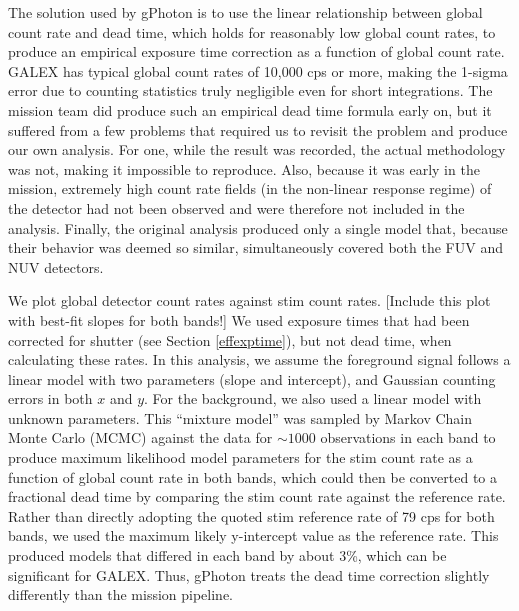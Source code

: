 \documentclass[5p]{elsarticle}
\begin{document}
The solution used by gPhoton is to use the linear relationship between global count rate and dead time, which holds for reasonably low global count rates, to produce an empirical exposure time correction as a function of global count rate. GALEX has typical global count rates of 10,000 cps or more, making the 1-sigma error due to counting statistics truly negligible even for short integrations. The mission team did produce such an empirical dead time formula early on, but it suffered from a few problems that required us to revisit the problem and produce our own analysis. For one, while the result was recorded, the actual methodology was not, making it impossible to reproduce. Also, because it was early in the mission, extremely high count rate fields (in the non-linear response regime) of the detector had not been observed and were therefore not included in the analysis. Finally, the original analysis produced only a single model that, because their behavior was deemed so similar, simultaneously covered both the FUV and NUV detectors.

We plot global detector count rates against stim count rates. {\color{red}[Include this plot with best-fit slopes for both bands!]} We used exposure times that had been corrected for shutter (see Section \ref{effexptime}), but not dead time, when calculating these rates. In this analysis, we assume the foreground signal follows a linear model with two parameters (slope and intercept), and Gaussian counting errors in both $x$ and $y$. For the background, we also used a linear model with unknown parameters. This ``mixture model'' was sampled by Markov Chain Monte Carlo (MCMC) against the data for $\sim 1000$ observations in each band to produce maximum likelihood model parameters for the stim count rate as a function of global count rate in both bands, which could then be converted to a fractional dead time by comparing the stim count rate against the reference rate. Rather than directly adopting the quoted stim reference rate of 79 cps for both bands, we used the maximum likely y-intercept value as the reference rate. This produced models that differed in each band by about 3\%, which can be significant for GALEX. Thus, gPhoton treats the dead time correction slightly differently than the mission pipeline.
\end{document}
